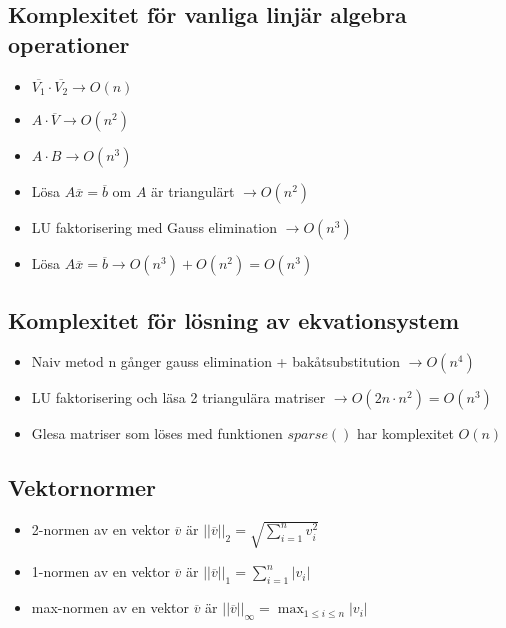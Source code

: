 \documentclass[a4paper,11pt]{article}
\begin{document}
\subsection{Komplexitet för vanliga linjär algebra operationer}
\begin{itemize}
    \item $\overline{V_1} \cdot \overline{V_2} \rightarrow O(n)$
    \item $A \cdot \overline{V} \rightarrow O(n^2)$
    \item $A \cdot B \rightarrow O(n^3)$
    \item Lösa $A\overline{x} = \overline{b}$ om $A$ är triangulärt $\rightarrow O(n^2)$
    \item LU faktorisering med Gauss elimination $\rightarrow O(n^3)$
    \item Lösa $A\overline{x} = \overline{b} \rightarrow O(n^3) + O(n^2) = O(n^3)$ 
\end{itemize}

\subsection{Komplexitet för lösning av ekvationsystem}
\begin{itemize}
    \item Naiv metod n gånger gauss elimination + bakåtsubstitution $\rightarrow O(n^4)$
    \item LU faktorisering och läsa 2 triangulära matriser $\rightarrow O(2n \cdot n^2) = O(n^3)$ 
    \item Glesa matriser som löses med funktionen $sparse()$ har komplexitet $O(n)$
\end{itemize}

\subsection{Vektornormer}
\begin{itemize}
    \item 2-normen av en vektor $\overline{v}$ är $||\overline{v}||_2 = \sqrt{\sum_{i=1}^n v_i^2}$
    \item 1-normen av en vektor $\overline{v}$ är $||\overline{v}||_1 = \sum_{i=1}^n |v_i|$
    \item max-normen av en vektor $\overline{v}$ är $||\overline{v}||_{\infty} = \max_{1 \leq i \leq n} |v_i|$
\end{itemize}
\newpage
\end{document}
